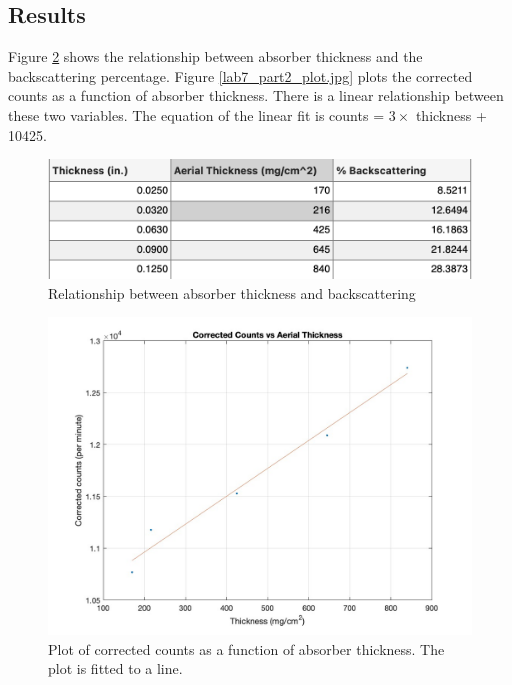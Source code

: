 \documentclass[reprint,amsmath,amssymb,aps,prl]{revtex4-2}
\begin{document}
\subsection{Results}
Figure \ref{fig:lab7_part2_plot} shows the relationship between absorber thickness and the backscattering percentage. Figure \ref{lab7_part2_plot.jpg} plots the corrected counts as a function of absorber thickness. There is a linear relationship between these two variables. The equation of the linear fit is counts = $ 3 \times$ thickness + 10425. 


\begin{figure}
    \centering
    \includegraphics[width = \columnwidth]{lab7_al_thickness_table.png}
    \caption{Relationship between absorber thickness and backscattering}
    \label{fig:lab7_plot_absorber_thickness}
\end{figure}

\begin{figure}
    \centering
    \includegraphics[width = \columnwidth]{lab7_part2_plot.jpg}
    \caption{Plot of corrected counts as a function of absorber thickness. The plot is fitted to a line.}
    \label{fig:lab7_part2_plot}
\end{figure}
\end{document}
